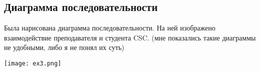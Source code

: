 \documentclass[a4paper,12pt]{report}
\begin{document}
	\begin{center}
		\section*{Диаграмма последовательности}
	\end{center}


	Была нарисована диаграмма последовательности. На ней изображено взаимодействие преподавателя и студента CSC.  
	(мне показались такие диаграммы не удобными, либо я не понял их суть)
	

	
	\texttt{[image: ex3.png]}
	
\end{document}
